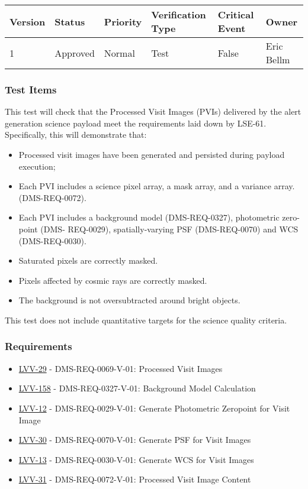 \begin{longtable}[]{@{}llllll@{}}
\toprule
Version & Status & Priority & Verification Type & Critical Event &
Owner\tabularnewline
\midrule
\endhead
1 & Approved & Normal & Test & False & Eric Bellm\tabularnewline
\bottomrule
\end{longtable}

\subsubsection{Test Items}\label{test-items-2}

This test will check that the Processed Visit Images (PVIs) delivered by
the alert generation science payload meet the requirements laid down by
LSE-61.\\
Specifically, this will demonstrate that:

\begin{itemize}
\tightlist
\item
  Processed visit images have been generated and persisted during
  payload execution;
\item
  Each PVI includes a science pixel array, a mask array, and a variance
  array. (DMS-REQ-0072).
\item
  Each PVI includes a background model (DMS-REQ-0327), photometric
  zero-point (DMS- REQ-0029), spatially-varying PSF (DMS-REQ-0070) and
  WCS (DMS-REQ-0030).
\item
  Saturated pixels are correctly masked.
\item
  Pixels affected by cosmic rays are correctly masked.
\item
  The background is not oversubtracted around bright objects.
\end{itemize}

This test does not include quantitative targets for the science quality
criteria.

\subsubsection{Requirements}\label{requirements-2}

\begin{itemize}
\tightlist
\item
  \href{https://jira.lsstcorp.org/browse/LVV-29}{LVV-29} -
  DMS-REQ-0069-V-01: Processed Visit Images
\item
  \href{https://jira.lsstcorp.org/browse/LVV-158}{LVV-158} -
  DMS-REQ-0327-V-01: Background Model Calculation
\item
  \href{https://jira.lsstcorp.org/browse/LVV-12}{LVV-12} -
  DMS-REQ-0029-V-01: Generate Photometric Zeropoint for Visit Image
\item
  \href{https://jira.lsstcorp.org/browse/LVV-30}{LVV-30} -
  DMS-REQ-0070-V-01: Generate PSF for Visit Images
\item
  \href{https://jira.lsstcorp.org/browse/LVV-13}{LVV-13} -
  DMS-REQ-0030-V-01: Generate WCS for Visit Images
\item
  \href{https://jira.lsstcorp.org/browse/LVV-31}{LVV-31} -
  DMS-REQ-0072-V-01: Processed Visit Image Content
\end{itemize}

